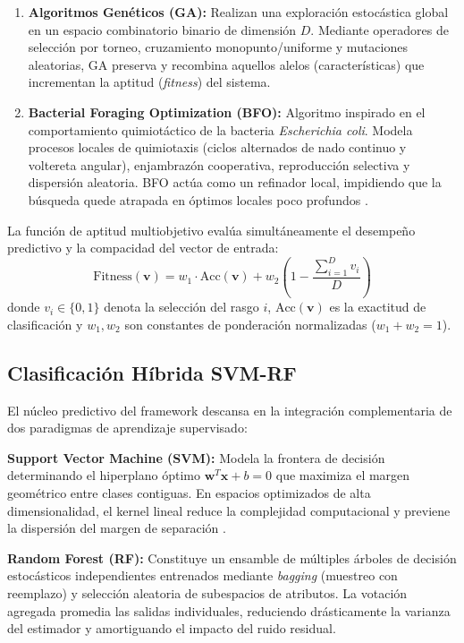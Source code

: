 \begin{enumerate}
    \item \textbf{Algoritmos Genéticos (GA):} Realizan una exploración estocástica global en un espacio combinatorio binario de dimensión $D$. Mediante operadores de selección por torneo, cruzamiento monopunto/uniforme y mutaciones aleatorias, GA preserva y recombina aquellos alelos (características) que incrementan la aptitud (\textit{fitness}) del sistema.
    \item \textbf{Bacterial Foraging Optimization (BFO):} Algoritmo inspirado en el comportamiento quimiotáctico de la bacteria \textit{Escherichia coli}. Modela procesos locales de quimiotaxis (ciclos alternados de nado continuo y voltereta angular), enjambrazón cooperativa, reproducción selectiva y dispersión aleatoria. BFO actúa como un refinador local, impidiendo que la búsqueda quede atrapada en óptimos locales poco profundos \cite{sonal2025}.
\end{enumerate}

La función de aptitud multiobjetivo evalúa simultáneamente el desempeño predictivo y la compacidad del vector de entrada:
\begin{equation}
\mathrm{Fitness}(\mathbf{v}) = w_1 \cdot \mathrm{Acc}(\mathbf{v}) + w_2 \left(1 - \frac{\sum_{i=1}^D v_i}{D}\right)
\end{equation}
donde $v_i \in \{0, 1\}$ denota la selección del rasgo $i$, $\mathrm{Acc}(\mathbf{v})$ es la exactitud de clasificación y $w_1, w_2$ son constantes de ponderación normalizadas ($w_1 + w_2 = 1$).

\subsection{Clasificación Híbrida SVM-RF}
El núcleo predictivo del framework descansa en la integración complementaria de dos paradigmas de aprendizaje supervisado:

\textbf{Support Vector Machine (SVM):} Modela la frontera de decisión determinando el hiperplano óptimo $\mathbf{w}^T \mathbf{x} + b = 0$ que maximiza el margen geométrico entre clases contiguas. En espacios optimizados de alta dimensionalidad, el kernel lineal reduce la complejidad computacional y previene la dispersión del margen de separación \cite{duda2000}.

\textbf{Random Forest (RF):} Constituye un ensamble de múltiples árboles de decisión estocásticos independientes entrenados mediante \textit{bagging} (muestreo con reemplazo) y selección aleatoria de subespacios de atributos. La votación agregada promedia las salidas individuales, reduciendo drásticamente la varianza del estimador y amortiguando el impacto del ruido residual.


